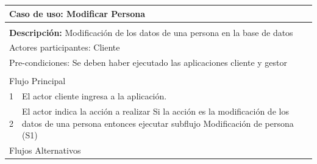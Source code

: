 \documentclass[11pt]{article}
\begin{document}
\begin{tabular}{|l|m{}|}
    \hline
    \multicolumn{2}{|m{0.9\textwidth}|}{{\bf Caso de uso: Modificar Persona}} \\
    \hline
    \multicolumn{2}{|l|}{\rowcolor[gray]{.5}} \\
    \hline
  
    \multicolumn{2}{|p{0.9\textwidth}|}{{\bf Descripción:} Modificaci\'on de los datos de una 
    persona en la base de datos } \\
  
    \hline
    \multicolumn{2}{|l|}{Actores participantes: Cliente} \\
    \hline
  
    \multicolumn{2}{|l|}{Pre-condiciones: Se deben haber ejecutado las aplicaciones cliente 
    y gestor} \\
  
    \hline
    \multicolumn{2}{|l|}{\rowcolor[gray]{.5}} \\
    \hline
    \multicolumn{2}{|l|}{Flujo Principal} \\
    \hline
    1 & El actor cliente ingresa a la aplicaci\'on. \\
    \hline
    2 &  El actor indica la acción a realizar \newline
    Si la acción es la modificaci\'on de los datos de una persona entonces ejecutar subflujo Modificaci\'on de persona (S1)\newline
   \\
    
    \hline
    \multicolumn{2}{|l|}{Flujos Alternativos} \\
    \hline
  

\end{tabular}
\end{document}
